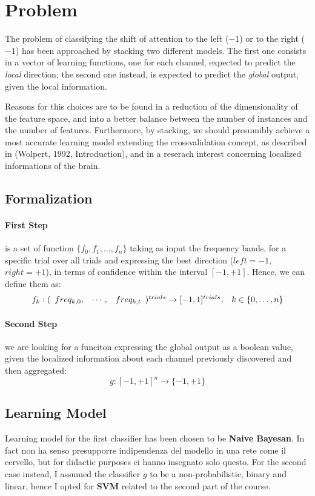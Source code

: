 \documentclass[10pt]{article}
\begin{document}
\section{Problem}
The problem of classifying the shift of attention to
the left ($-1$) or to the right ($-1$) has been
approached by stacking\cite{Wolpert92} two different
models. The first one consists in a vector of
learning functions, one for each channel, expected to
predict the \emph{local} direction; the second one
instead, is expected to predict the \emph{global}
output, given the local information.

Reasons for this choices are to be found in a reduction of the dimensionality of the feature space, and into a better balance between the number of instances and the number of features.
Furthermore, by stacking, we should presumibly
achieve a most accurate learning model extending the crossvalidation concept, as described in (Wolpert, 1992, Introduction)\cite{Wolpert92}, and in a reserach interest concerning localized informations of the brain.


\subsection{Formalization} 

\paragraph{First Step} is a set of function 
$ \{f_0, f_1, \dots, f_n \}$ 
taking as input the frequency bands, for a specific trial over all trials and expressing the best direction ($left=-1$, $right=+1$), in terms of confidence within the interval $[-1, +1]$. Hence, we can define them as:
$$
\begin{array}{lr}
f_k: (\begin{array}{l l l} freq_{k, 0}, & \cdots, & freq_{k, t} \end{array})^{trials} \to [-1, 1]^{trials},
&
k \in \{0, \dots, n\}
\end{array}
$$ 


\paragraph{Second Step} we are looking for a funciton expressing the global output as a boolean value, given the localized information about each channel previously discovered and then aggregated:
$$
g: [-1, +1]^n \to \{-1, +1\}
$$


\subsection{Learning Model}
Learning model for the first classifier has been chosen to be \textbf{Naive Bayesan}. In fact non ha senso presupporre indipendenza del modello in una rete come il cervello, but for didactic purposes ci hanno insegnato solo questo.
 For the second case instead, I assumed the classifier $g$ to be  a non-probabilistic, binary and linear, hence I opted for \textbf{SVM} related to the second part of the course.
\end{document}
